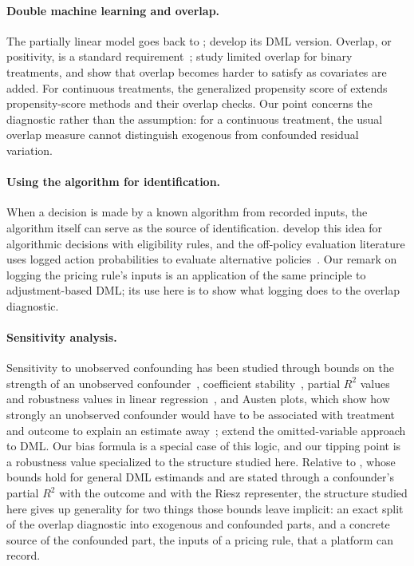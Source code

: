 \documentclass[11pt]{article}
\theoremstyle{remark}
\begin{document}
\paragraph{Double machine learning and overlap.} The partially linear model goes back to \citet{robinson1988}; \citet{chernozhukov2018} develop its DML version. Overlap, or positivity, is a standard requirement~\citep{rosenbaum1983, imbens2015}; \citet{crump2009} study limited overlap for binary treatments, and \citet{damour2021} show that overlap becomes harder to satisfy as covariates are added. For continuous treatments, the generalized propensity score of \citet{hirano2004} extends propensity-score methods and their overlap checks. Our point concerns the diagnostic rather than the assumption: for a continuous treatment, the usual overlap measure cannot distinguish exogenous from confounded residual variation.

\paragraph{Using the algorithm for identification.} When a decision is made by a known algorithm from recorded inputs, the algorithm itself can serve as the source of identification. \citet{narita2021} develop this idea for algorithmic decisions with eligibility rules, and the off-policy evaluation literature uses logged action probabilities to evaluate alternative policies~\citep{bottou2013, dudik2011}. Our remark on logging the pricing rule's inputs is an application of the same principle to adjustment-based DML; its use here is to show what logging does to the overlap diagnostic.

\paragraph{Sensitivity analysis.} Sensitivity to unobserved confounding has been studied through bounds on the strength of an unobserved confounder~\citep{rosenbaum2002, imbens2003}, coefficient stability~\citep{altonji2005, oster2019}, partial $R^2$ values and robustness values in linear regression~\citep{cinelli2020}, and Austen plots, which show how strongly an unobserved confounder would have to be associated with treatment and outcome to explain an estimate away~\citep{veitch2020}; \citet{chernozhukov2022} extend the omitted-variable approach to DML. Our bias formula is a special case of this logic, and our tipping point is a robustness value specialized to the structure studied here. Relative to \citet{chernozhukov2022}, whose bounds hold for general DML estimands and are stated through a confounder's partial $R^2$ with the outcome and with the Riesz representer, the structure studied here gives up generality for two things those bounds leave implicit: an exact split of the overlap diagnostic into exogenous and confounded parts, and a concrete source of the confounded part, the inputs of a pricing rule, that a platform can record.
\end{document}
